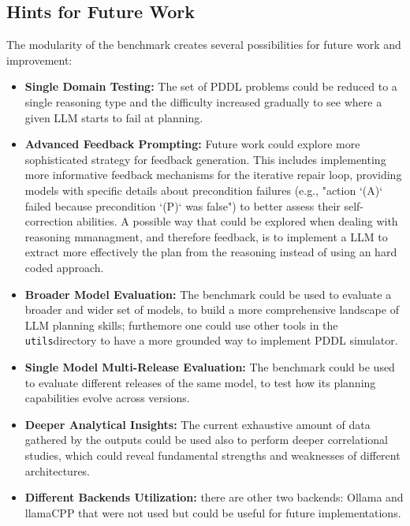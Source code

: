 \subsection{Hints for Future Work}
The modularity of the benchmark creates several possibilities for future work and improvement:
\begin{itemize}
    \item \textbf{Single Domain Testing:} The set of PDDL problems could be reduced to a single reasoning type and the difficulty increased gradually to see where a given LLM starts to fail at planning.
    
    \item \textbf{Advanced Feedback Prompting:} Future work could explore more sophisticated strategy for feedback generation. This includes implementing more informative feedback mechanisms for the iterative repair loop, providing models with specific details about precondition failures (e.g., "action `(A)` failed because precondition `(P)` was false") to better assess their self-correction abilities. A possible way that could be explored when dealing with reasoning mmanagment, and therefore feedback, is to implement a LLM to extract more effectively the plan from the reasoning instead of using an hard coded approach.
    
    \item \textbf{Broader Model Evaluation:} The benchmark could be used to evaluate a broader and wider set of models, to build a more comprehensive landscape of LLM planning skills; furthemore one could use other tools in the \texttt{utils}directory to have a more grounded way to implement PDDL simulator. 

    \item \textbf{Single Model Multi-Release Evaluation:} The benchmark could be used to evaluate different releases of the same model, to test how its planning capabilities evolve across versions.
    
    \item \textbf{Deeper Analytical Insights:} The current exhaustive amount of data gathered by the outputs could be used also to perform deeper correlational studies, which could reveal fundamental strengths and weaknesses of different architectures.
    
    \item \textbf{Different Backends Utilization:}      there are other two backends: Ollama and llamaCPP that were not used but could be useful for future implementations.

\end{itemize}
